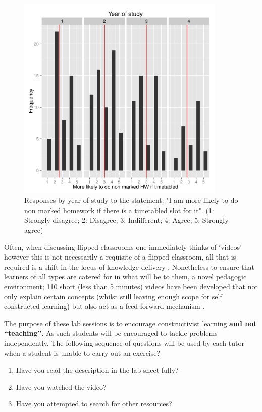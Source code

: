 \documentclass{article}
\begin{document}
\begin{figure}[htdp]
\begin{center}
\includegraphics[width=10cm]{Images/morelikelytodohwiftimetabled.pdf}
\caption{Responses by year of study to the statement: "I am more likely to do non marked homework if there is a timetabled slot for it". (1: Strongly disagree; 2: Disagree; 3: Indifferent; 4: Agree; 5: Strongly agree)}\label{morelikelytodohwiftimetabled}
\end{center}
\end{figure}

Often, when discussing flipped classrooms one immediately thinks of `videos' however this is not necessarily a requisite of a flipped classroom, all that is required is a shift in the locus of knowledge delivery \cite{robert_talbert_inverted_2013}. Nonetheless to ensure that learners of all types are catered for in what will be to them, a novel pedagogic environment; 110 short (less than 5 minutes) videos have been developed that not only explain certain concepts (whilst still leaving enough scope for self constructed learning) but also act as a feed forward mechanism \cite{conaghan_feedback_2009}.

The purpose of these lab sessions is to encourage constructivist learning \textbf{and not ``teaching''}. As such students will be encouraged to tackle problems independently. The following sequence of questions will be used by each tutor when a student is unable to carry out an exercise?

\begin{enumerate}
    \item Have you read the description in the lab sheet fully?
    \item Have you watched the video?
    \item Have you attempted to search for other resources?
\end{enumerate}
\end{document}

